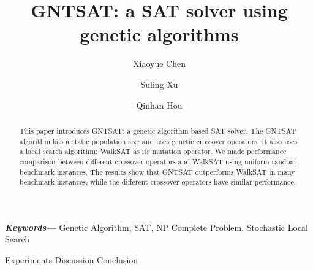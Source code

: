 \documentclass[oneside,twocolumn,a4paper]{article}
\title{GNTSAT: a SAT solver using genetic algorithms}
\author{
	Xiaoyue Chen \and Suling Xu \and Qinhan Hou
}
\providecommand{\keywords}[1]
{
	\small
	\textbf{\textit{Keywords---}} #1
}
\begin{document}
\maketitle

\begin{abstract}
	This paper introduces GNTSAT: a genetic algorithm based SAT solver. The GNTSAT
	algorithm has a static population size and uses genetic crossover operators.
	It also uses a local search algorithm: \mbox{WalkSAT}
	\parencite{selman1994noise} as its mutation operator. We made performance comparison
	between different crossover operators and WalkSAT using uniform random
	benchmark instances. The results show that GNTSAT outperforms WalkSAT in many
	benchmark instances, while the different crossover operators have similar
	performance.
\end{abstract}

\smallskip
\keywords{Genetic Algorithm, SAT, NP Complete Problem, Stochastic Local Search}




 {Experiments}
 {Discussion}
 {Conclusion}

\printbibliography

\clearpage
\end{document}
